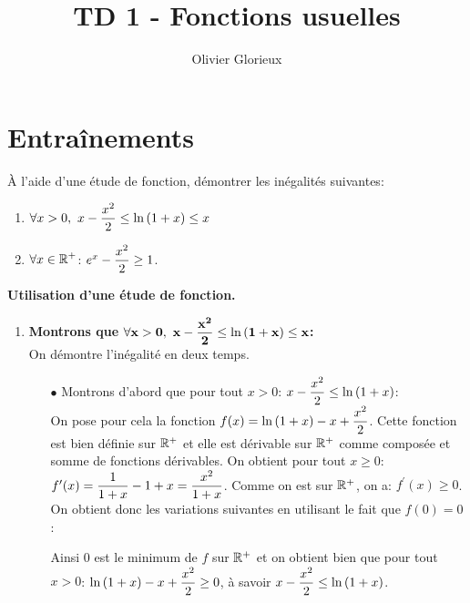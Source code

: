 \documentclass[a4paper, 11pt]{article}
\author{Olivier Glorieux}
\newcommand{\type}{TD }
\begin{document}
\title{\type 1 - Fonctions usuelles}

\section*{Entraînements}

\begin{exercice} 
\`{A} l'aide d'une \'etude de fonction, d\'emontrer les in\'egalit\'es suivantes:
\begin{enumerate}
\item $\forall \ddp x>0,\ x-\frac{x^2}{2}\leq \ln{(1+x)}\leq x$
\item $\forall \displaystyle x\in\mathbb{R}^+$: $e^x-\displaystyle\frac{x^2}{2}\geq 1$.
\end{enumerate}
\end{exercice}


\begin{correction}  \; \textbf{Utilisation d'une \'etude de fonction.}\\
\begin{enumerate}
\item \textbf{Montrons que $\mathbf{\forall x>0,\displaystyle\ x-\frac{x^2}{2}\leq \ln{(1+x)}\leq x}$:}\\
\noindent On d\'emontre l'in\'egalit\'e en deux temps.
\begin{itemize}
\item[$\bullet$] Montrons d'abord que pour tout $x>0$: $x-\displaystyle\frac{x^2}{2}\leq \ln{(1+x)}$:\\
\noindent On pose pour cela la fonction $f(x)=\ln{(1+x)}-x+\displaystyle\frac{x^2}{2}$. Cette fonction est bien d\'efinie sur $\mathbb{R}^{+}$ et elle est d\'erivable sur $\mathbb{R}^{+}$ comme compos\'ee et somme de fonctions d\'erivables. On obtient pour tout $x\geq  0$: $f^{\prime}(x)=\displaystyle\frac{1}{1+x}-1+x=\displaystyle\frac{x^2}{1+x}$. Comme on est sur $\mathbb{R}^{+}$, on a: $f^{\prime}(x)\geq 0$. On obtient donc les variations suivantes en utilisant le fait que $f(0)=0$: 
\begin{center}
\end{center}
Ainsi $0$ est le minimum de $f$ sur $\mathbb{R}^{+}$ et on obtient bien que pour tout $x>0$: $\ln{(1+x)}-x+\displaystyle\frac{x^2}{2}\geq 0$, \`{a} savoir $x-\displaystyle\frac{x^2}{2} \leq \ln{(1+x)}$.

\end{itemize}
\end{enumerate}
\end{correction}
\end{document}
